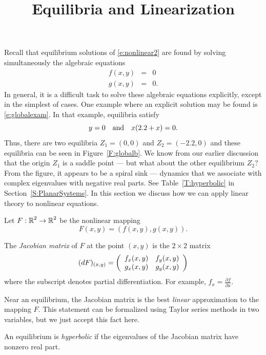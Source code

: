 \documentclass{ximera}
\title{Equilibria and Linearization}
\begin{document}
\begin{abstract}
\end{abstract}
\maketitle

 \label{S:linearization}
  

Recall that equilibrium solutions of \eqref{e:nonlinear2}
are found by solving simultaneously the algebraic equations
\begin{equation}
\begin{array}{rcl} 
f(x,y) & = & 0 \\
g(x,y) & = & 0.
\end{array}
\end{equation}
In general, it is a difficult task to solve these algebraic
equations explicitly, except in the simplest of cases. One
example where an explicit solution may be found is
\eqref{e:globalexam}.  In that example, equilibria satisfy
\[
y  =  0 \quad\mbox{and}\quad x(2.2+x) = 0.
\]
Thus, there are two equilibria $Z_1=(0,0)$ and $Z_2=(-2.2,0)$
and these equilibria can be seen in Figure~\ref{F:globalb}.  We
know from our earlier discussion that the origin $Z_1$ is a
saddle point --- but what about the other equilibrium $Z_2$?
From the figure, it appears to be a spiral sink --- dynamics
that we associate with complex eigenvalues with negative real
parts.  See Table~\ref{T:hyperbolic} in Section~\ref{S:PlanarSystems}.  
In this section we discuss how we can apply linear theory to 
nonlinear equations. 

Let $F:\mbox{$\mathbb{R}$}^2\to\mbox{$\mathbb{R}$}^2$ be the nonlinear mapping 
\[
F(x,y)=(f(x,y),g(x,y)).
\]
\begin{definition}  \label{D:Jacobian}
The {\em Jacobian matrix} 
 of $F$ at the point 
$(x,y)$ is the $2\times 2$ matrix 
\begin{equation}  \label{e:jacobian}
(dF)_{(x,y)} = \left(\begin{array}{rr} f_x(x,y) & f_y(x,y)\\ g_x(x,y) &g_y(x,y)\end{array}\right)
\end{equation}
where the subscript denotes partial differentiation.  For example, 
$f_x=\frac{\partial f}{\partial x}$.
\end{definition}

Near an equilibrium, the Jacobian matrix is the best {\em linear\/}
approximation to the mapping $F$.  
This statement can be formalized using 
Taylor series methods in two variables, but we just accept this fact here. 
\begin{definition}  \label{D:hyperbolic}
An equilibrium is {\em hyperbolic\/} if the eigenvalues of the 
Jacobian matrix have nonzero real part. 
\end{definition} 
\end{document}
